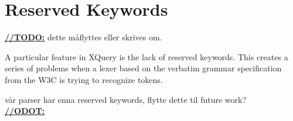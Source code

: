 \section{Reserved Keywords}

\underline{\textbf{\LARGE //TODO:}} dette m\aa flyttes eller skrives om.

A particular feature in XQuery is the lack of reserved keywords. This creates a
series of problems when a lexer based on the verbatim grammar specification from
the W3C is trying to recognize tokens. 

v\aa r parser har enna reserved keywords, flytte dette til future work? \\
\underline{\textbf{\LARGE //ODOT:}} 



